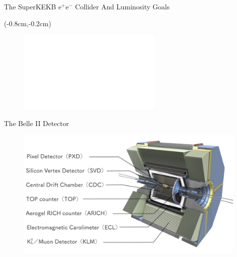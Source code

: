 \documentclass[8pt]{beamer}
\begin{document}
\begin{frame}{The SuperKEKB $\textrm{e}^+\textrm{e}^-$ Collider And Luminosity Goals}
{\begin{textblock*}{6cm}
\end{textblock*}
}














\begin{textblock*}{7cm}(-0.8cm,-0.2cm)
	\begin{figure}
		\includegraphics<2>[width=7cm]{VBilder/Beamsize.pdf}
	\end{figure}
	
	
\end{textblock*}




\end{frame}


\begin{frame}{The Belle II Detector}

\begin{figure}
	\includegraphics[width=\textwidth]{VBilder/Belle2.pdf}
\end{figure}


	
\end{frame}
\end{document}
